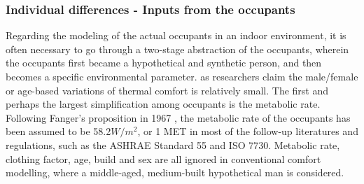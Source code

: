\subsubsection{Individual differences - Inputs from the occupants}
	Regarding the modeling of the actual occupants in an indoor environment, it is often necessary to go through a two-stage abstraction of the occupants, wherein the occupants first became a hypothetical and synthetic person, and then becomes a specific environmental parameter.  as researchers claim the male/female or age-based variations of thermal comfort is relatively small. 
	The first and perhaps the largest simplification among occupants is the metabolic rate. Following Fanger's proposition in 1967 \cite{fanger_calculation_1967}, the metabolic rate of the occupants has been assumed to be 58.2$W/m^2$, or 1 MET in most of the follow-up literatures and regulations, such as the ASHRAE Standard 55\cite{ashrae_ansi/ashrae_2013} and ISO 7730\cite{iso_iso_2005}. 
        Metabolic rate, clothing factor, age, build and sex are all ignored in conventional comfort modelling, where a middle-aged, medium-built hypothetical man is considered.

